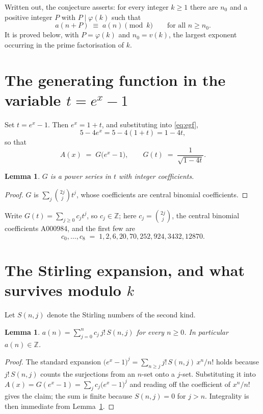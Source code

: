 \documentclass[11pt,a4paper]{article}
\theoremstyle{plain}
\newtheorem{lemma}[theorem]{Lemma}
\theoremstyle{definition}
\begin{document}
Written out, the conjecture asserts: for every integer $k\ge 1$ there are $n_0$ and a
positive integer $P$ with $P\mid\varphi(k)$ such that
\begin{equation}\label{eq:conj}
a(n+P)\;\equiv\;a(n)\pmod{k}\qquad\text{for all } n\ge n_0 .
\end{equation}
It is proved below, with $P=\varphi(k)$ and $n_0=v(k)$, the largest exponent occurring in
the prime factorisation of $k$.

\section{The generating function in the variable $t=e^{x}-1$}

Set $t=e^{x}-1$. Then $e^{x}=1+t$, and substituting into \eqref{eq:egf},
\[
5-4e^{x}=5-4(1+t)=1-4t,
\]
so that
\begin{equation}\label{eq:G}
A(x)\;=\;G\bigl(e^{x}-1\bigr),\qquad
G(t)\;=\;\frac{1}{\sqrt{1-4t}}.
\end{equation}

\begin{lemma}\label{lem:int}
$G$ is a power series in $t$ with integer coefficients.
\end{lemma}

\begin{proof}
$G$ is $\sum_j \binom{2j}{j}t^{j}$, whose coefficients are central binomial coefficients.
\end{proof}

Write $G(t)=\sum_{j\ge0}c_j t^{j}$, so $c_j\in\mathbb{Z}$; here $c_j=\binom{2j}{j}$, the central binomial coefficients A000984, and the
first few are
\[
c_0,\dots,c_8 \;=\; 1, 2, 6, 20, 70, 252, 924, 3432, 12870.
\]

\section{The Stirling expansion, and what survives modulo $k$}

Let $S(n,j)$ denote the Stirling numbers of the second kind.

\begin{lemma}\label{lem:stir}
$a(n)=\sum_{j=0}^{n} c_j\, j!\, S(n,j)$ for every $n\ge 0$. In particular $a(n)\in\mathbb{Z}$.
\end{lemma}

\begin{proof}
The standard expansion $\bigl(e^{x}-1\bigr)^{j}
=\sum_{n\ge j} j!\,S(n,j)\,x^{n}/n!$ holds because $j!\,S(n,j)$ counts the surjections
from an $n$-set onto a $j$-set. Substituting it into
$A(x)=G(e^{x}-1)=\sum_j c_j\bigl(e^{x}-1\bigr)^{j}$ and reading off the coefficient of
$x^{n}/n!$ gives the claim; the sum is finite because $S(n,j)=0$ for $j>n$. Integrality is
then immediate from Lemma~\ref{lem:int}.
\end{proof}
\end{document}
